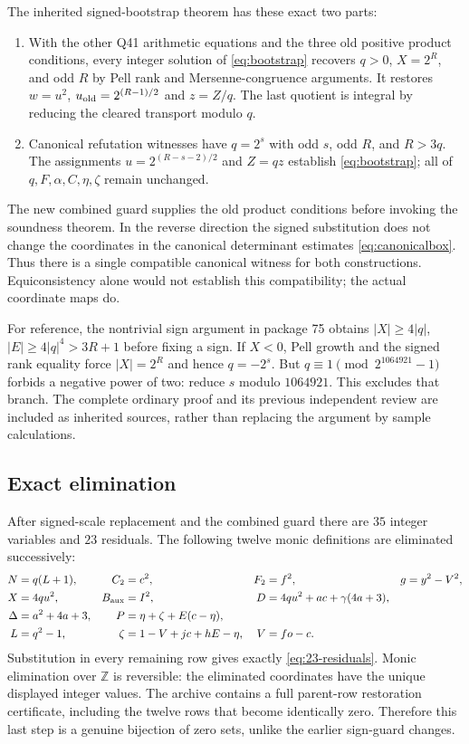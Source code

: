 \documentclass[11pt]{article}
\newcommand{\Z}{\mathbb Z}
\begin{document}
The inherited signed-bootstrap theorem has these exact two parts:
\begin{enumerate}[leftmargin=*]
\item With the other Q41 arithmetic equations and the three old positive
product conditions, every integer solution of \eqref{eq:bootstrap}
recovers $q>0$, $X=2^R$, and odd $R$ by Pell rank and Mersenne-congruence
arguments. It restores $w=u^2$, $u_{\rm old}=2^{(R-1)/2}$ and $z=Z/q$.
The last quotient is integral by reducing the cleared transport modulo $q$.
\item Canonical refutation witnesses have $q=2^s$ with odd $s$,
odd $R$, and $R>3q$. The assignments
$u=2^{(R-s-2)/2}$ and $Z=qz$ establish \eqref{eq:bootstrap}; all of
$q,F,\alpha,C,\eta,\zeta$ remain unchanged.
\end{enumerate}
The new combined guard supplies the old product conditions before invoking
the soundness theorem. In the reverse direction the signed substitution
does not change the coordinates in the canonical determinant estimates
\eqref{eq:canonicalbox}. Thus there is a single compatible canonical witness
for both constructions. Equiconsistency alone would not establish this
compatibility; the actual coordinate maps do.

For reference, the nontrivial sign argument in package 75 obtains
$|X|\ge4|q|$, $|E|\ge4|q|^4>3R+1$ before fixing a sign. If $X<0$,
Pell growth and the signed rank equality force $|X|=2^R$ and hence
$q=-2^s$. But $q\equiv1\pmod{2^{1064921}-1}$ forbids a negative power of
two: reduce $s$ modulo $1064921$. This excludes that branch. The complete
ordinary proof and its previous independent review are included as inherited
sources, rather than replacing the argument by sample calculations.

\subsection{Exact elimination}
After signed-scale replacement and the combined guard there are $35$
integer variables and $23$ residuals. The following twelve monic definitions
are eliminated successively:
\begin{align*}
 N&=q(L+1),& C_2&=c^2,& F_2&=f^2,& g&=y^2-V^2,\\
 X&=4qu^2,& B_{\rm aux}&=I^2,&
 D&=4qu^2+ac+\gamma(4a+3),&&\\
 \Delta&=a^2+4a+3,&P&=\eta+\zeta+E(c-\eta),&&&&\\
 L&=q^2-1,& \zeta&=1-V+jc+hE-\eta,& V&=fo-c.&&
\end{align*}
Substitution in every remaining row gives exactly
\eqref{eq:23-residuals}. Monic elimination over $\Z$ is reversible:
the eliminated coordinates have the unique displayed integer values.
The archive contains a full parent-row restoration certificate, including
the twelve rows that become identically zero. Therefore this last step is
a genuine bijection of zero sets, unlike the earlier sign-guard changes.
\end{document}
